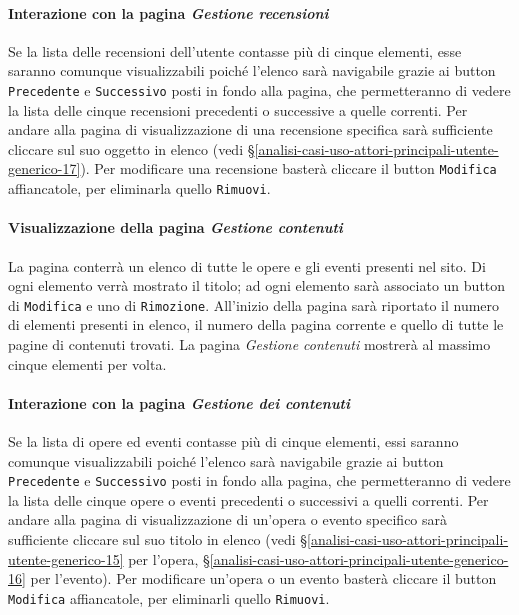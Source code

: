 \paragraph{Interazione con la pagina \textit{Gestione recensioni}}
\label{analisi-casi-uso-attori-principali-utente-amministratore-7}
Se la lista delle recensioni dell'utente contasse più di cinque elementi, esse saranno comunque visualizzabili poiché l'elenco sarà navigabile grazie ai button \texttt{Precedente} e \texttt{Successivo} posti in fondo alla pagina, che permetteranno di vedere la lista delle cinque recensioni precedenti o successive a quelle correnti. Per andare alla pagina di visualizzazione di una recensione specifica sarà sufficiente cliccare sul suo oggetto in elenco (vedi §\ref{analisi-casi-uso-attori-principali-utente-generico-17}). Per modificare una recensione basterà cliccare il button \texttt{Modifica} affiancatole, per eliminarla quello \texttt{Rimuovi}.


\paragraph{Visualizzazione della pagina \textit{Gestione contenuti}}
\label{analisi-casi-uso-attori-principali-utente-amministratore-8}
La pagina conterrà un elenco di tutte le opere e gli eventi presenti nel sito. Di ogni elemento verrà mostrato il titolo; ad ogni elemento sarà associato un button di \texttt{Modifica} e uno di \texttt{Rimozione}. All'inizio della pagina sarà riportato il numero di elementi presenti in elenco, il numero della pagina corrente e quello di tutte le pagine di contenuti trovati. La pagina \textit{Gestione contenuti} mostrerà al massimo cinque elementi per volta.


\paragraph{Interazione con la pagina \textit{Gestione dei contenuti}}
\label{analisi-casi-uso-attori-principali-utente-amministratore-9}
Se la lista di opere ed eventi contasse più di cinque elementi, essi saranno comunque visualizzabili poiché l'elenco sarà navigabile grazie ai button \texttt{Precedente} e \texttt{Successivo} posti in fondo alla pagina, che permetteranno di vedere la lista delle cinque opere o eventi precedenti o successivi a quelli correnti. Per andare alla pagina di visualizzazione di un'opera o evento specifico sarà sufficiente cliccare sul suo titolo in elenco (vedi §\ref{analisi-casi-uso-attori-principali-utente-generico-15} per l'opera, §\ref{analisi-casi-uso-attori-principali-utente-generico-16} per l'evento). Per modificare un'opera o un evento basterà cliccare il button \texttt{Modifica} affiancatole, per eliminarli quello \texttt{Rimuovi}.



